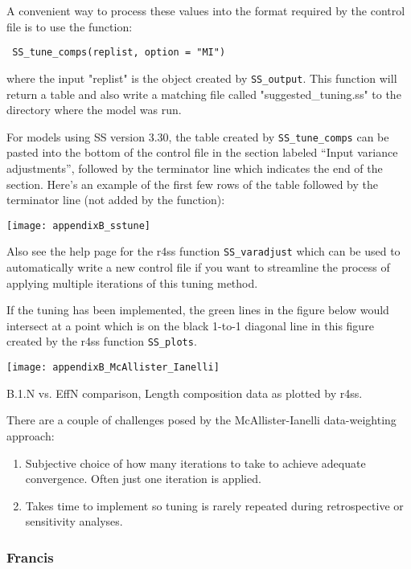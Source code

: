 A convenient way to process these values into the format required by the control file is to use the function:

\texttt{ SS\_tune\_comps(replist, option = "MI") }

where the input "replist" is the object created by \texttt{SS\_output}. This function will return a table and also write a matching file called "suggested\_tuning.ss" to the directory where the model was run.

For models using SS version 3.30, the table created by \texttt{SS\_tune\_comps} can be pasted into the bottom of the control file in the section labeled “Input variance adjustments”, followed by the terminator line which indicates the end of the section. Here's an example of the first few rows of the table followed by the terminator line (not added by the function):

\begin{center}
	\texttt{[image: appendixB\_sstune]}\\
\end{center}

Also see the help page for the r4ss function \texttt{SS\_varadjust} which can be used to automatically write a new control file if you want to streamline the process of applying multiple iterations of this tuning method.

If the tuning has been implemented, the green lines in the figure below would intersect at a point which is on the black 1-to-1 diagonal line in this figure created by the r4ss function \texttt{SS\_plots}.

\begin{center}
	\texttt{[image: appendixB\_McAllister\_Ianelli]}\\
\end{center}
\figurename{ B.1.N vs. EffN comparison, Length composition data as plotted by r4ss.}

There are a couple of challenges posed by the McAllister-Ianelli data-weighting approach:
\begin{enumerate}
	\item Subjective choice of how many iterations to take to achieve adequate convergence. Often just one iteration is applied.
	
	\item Takes time to implement so tuning is rarely repeated during retrospective or sensitivity analyses.
\end{enumerate}

\subsubsection{Francis}

